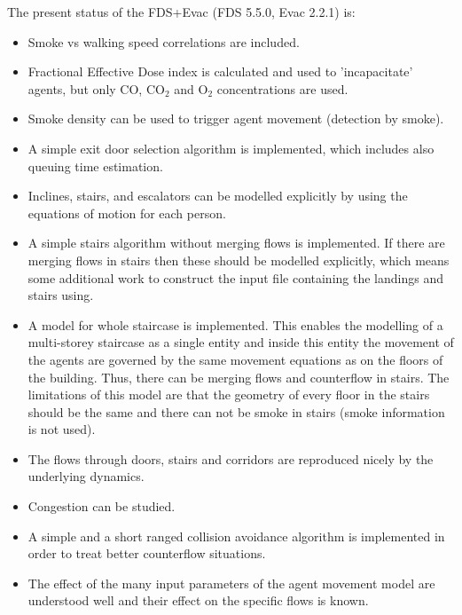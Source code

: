 \documentclass[12pt,a4paper,final,twoside]{stylevk}
\begin{document}
The present status of the FDS+Evac (FDS 5.5.0, Evac 2.2.1) is:
%
\begin{itemize}
%
\item Smoke vs walking speed correlations are included.
%
\item Fractional Effective Dose index is calculated and used to
  'incapacitate' agents, but only CO, CO${}_\mathrm{2}$ and
  O${}_\mathrm{2}$ concentrations are used.
%
\item Smoke density can be used to trigger agent movement (detection
  by smoke).
%
\item A simple exit door selection algorithm is implemented, which
  includes also queuing time estimation.
%
\item Inclines, stairs, and escalators can be modelled explicitly by
  using the equations of motion for each person.
%
\item A simple stairs algorithm without merging flows is implemented.
  If there are merging flows in stairs then these should be modelled
  explicitly, which means some additional work to construct the input
  file containing the landings and stairs using.
%
\item A model for whole staircase is implemented.  This enables the
  modelling of a multi-storey staircase as a single entity and inside
  this entity the movement of the agents are governed by the same
  movement equations as on the floors of the building.  Thus, there
  can be merging flows and counterflow in stairs.  The limitations of
  this model are that the geometry of every floor in the stairs should
  be the same and there can not be smoke in stairs (smoke information
  is not used).
%
\item The flows through doors, stairs and corridors are reproduced
  nicely by the underlying dynamics.
%
\item Congestion can be studied.
%
\item A simple and a short ranged collision avoidance algorithm is
  implemented in order to treat better counterflow situations.
%
\item The effect of the many input parameters of the agent movement
  model are understood well and their effect on the specific flows is
  known.
%
\end{itemize}
%
\end{document}
